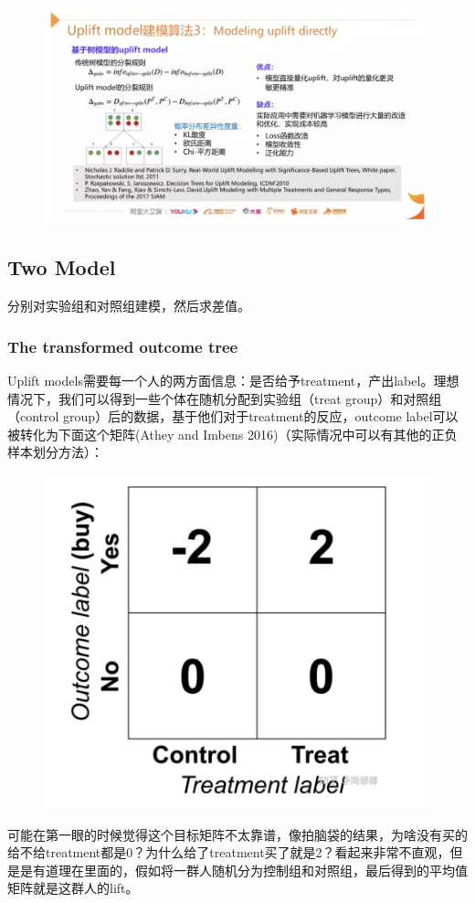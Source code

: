 \documentclass[12pt]{article}
\begin{document}
\begin{figure}[H]
    \centering
    \includegraphics[width=1\textwidth]{fig/CasualInference-Uplift-Model-Direct-Model.png}
\end{figure}


\subsection{Two Model}
分别对实验组和对照组建模，然后求差值。

\subsubsection{The transformed outcome tree}
Uplift models需要每一个人的两方面信息：是否给予treatment，产出label。理想情况下，我们可以得到一些个体在随机分配到实验组（treat group）和对照组（control group）后的数据，基于他们对于treatment的反应，outcome label可以被转化为下面这个矩阵(Athey and Imbens 2016)（实际情况中可以有其他的正负样本划分方法）：
\begin{figure}[H]
    \centering
    \includegraphics[width=.5\textwidth]{fig/CasualInference-Uplift-Model-Label.png}
\end{figure}

可能在第一眼的时候觉得这个目标矩阵不太靠谱，像拍脑袋的结果，为啥没有买的给不给treatment都是0？为什么给了treatment买了就是2？看起来非常不直观，但是是有道理在里面的，假如将一群人随机分为控制组和对照组，最后得到的平均值矩阵就是这群人的lift。
\end{document}
